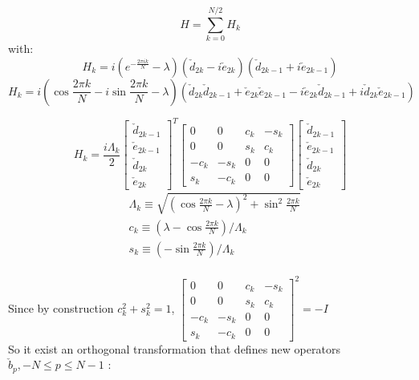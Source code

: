 \documentclass[10pt,a4paper]{article}
\begin{document}
	\begin{equation}H=\sum_{k=0}^{N / 2} H_{k} \end{equation}
		with:
		\begin{equation}
	H_k =i   \left(e^{-\frac{2\pi i k}{N}} 
	- \lambda \right)  \left(\check{d}_{2 k}-i\check{e}_{2 k}\right) \left(\check{d}_{2 k-1}+i\check{e}_{2 k-1}  \right)
	\end{equation}
			\begin{equation}
	H_k =i  \left(\cos \frac{2 \pi k }{N}-i\sin \frac{2 \pi k }{N}
	- \lambda \right)  \left(\check{d}_{2 k}\check{d}_{2 k-1}+\check{e}_{2 k}\check{e}_{2 k-1}-i\check{e}_{2k}\check{d}_{2k-1}+i\check{d}_{2k}\check{e}_{2k-1}\right) 
	\end{equation}

	\begin{equation}H_{k}=\frac{i\Lambda_k}{2}\left[\begin{array}{c}
	\check{d}_{2 k-1} \\
	\check{e}_{2 k-1} \\
	\check{d}_{2 k} \\
	\check{e}_{2 k}
	\end{array}\right]^{T}\left[\begin{array}{cccc}
	0 & 0 & c_{k} & -s_{k} \\
	0 & 0 & s_{k} & c_{k} \\
	-c_{k} &-s_{k} & 0 & 0 \\
	s_{k} &- c_{k} & 0 & 0
	\end{array}\right]\left[\begin{array}{c}
	\check{d}_{2 k-1} \\
	\check{e}_{2 k-1} \\
	\check{d}_{2 k} \\
	\check{e}_{2 k}
	\end{array}\right]\end{equation}
	\newline
	\begin{equation}
	\begin{aligned}
&\Lambda_k \equiv\sqrt{\left(\cos \frac{2 \pi k }{N}-\lambda\right)^2+\sin^2 \frac{2 \pi k }{N}}
\\
&c_{k}\equiv\left(\lambda-\cos \frac{2 \pi k }{N}\right)/\Lambda_k
\\
&s_{k}\equiv\left(-\sin \frac{2 \pi k }{N}\right)/\Lambda_k
	\end{aligned}
	\end{equation}\\
Since by construction $c_k^2+s_k^2=1$,
 $\left[\begin{array}{cccc}
0 & 0 & c_{k} & -s_{k} \\
0 & 0 & s_{k} & c_{k} \\
-c_{k} &-s_{k} & 0 & 0 \\
s_{k} &- c_{k} & 0 & 0\end{array}\right]^2 =-I$ \\
So it exist an orthogonal transformation that defines new operators $\check{b}_{p},  -N\le p \le N-1$ :
\end{document}
